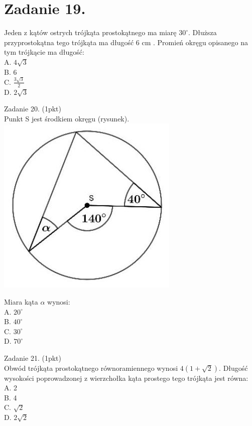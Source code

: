 \documentclass[10pt]{article}
\begin{document}
\section*{Zadanie 19.}
Jeden z kątów ostrych trójkąta prostokątnego ma miarę \(30^{\circ}\). Dłuższa przyprostokątna tego trójkąta ma długość 6 cm . Promień okręgu opisanego na tym trójkącie ma długość:\\
A. \(4 \sqrt{3}\)\\
B. 6\\
C. \(\frac{3 \sqrt{3}}{2}\)\\
D. \(2 \sqrt{3}\)

Zadanie 20. (1pkt)\\
Punkt S jest środkiem okręgu (rysunek).\\
\includegraphics[max width=\textwidth, center]{2024_11_21_a68a2ba4fc31c5fb438eg-06}

Miara kąta \(\alpha\) wynosi:\\
A. \(20^{\circ}\)\\
B. \(40^{\circ}\)\\
C. \(30^{\circ}\)\\
D. \(70^{\circ}\)

Zadanie 21. (1pkt)\\
Obwód trójkąta prostokątnego równoramiennego wynosi \(4(1+\sqrt{2})\). Długość wysokości poprowadzonej z wierzchołka kąta prostego tego trójkąta jest równa:\\
A. 2\\
B. 4\\
C. \(\sqrt{2}\)\\
D. \(2 \sqrt{2}\)
\end{document}
